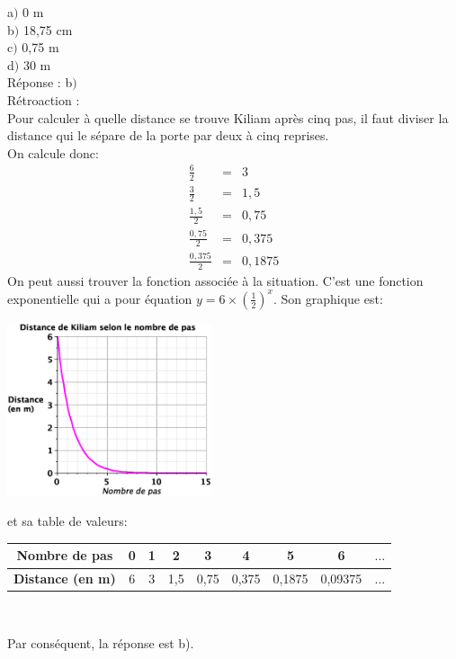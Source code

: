 \documentclass[letterpaper, 12pt]{article}
\begin{document}
a$)$ 0 m\\
b$)$ 18,75 cm\\
c$)$ 0,75 m\\
d$)$ 30 m\\

R\'eponse : b$)$\\

R\'etroaction :\\
Pour calculer \`a quelle distance se trouve Kiliam apr\`es cinq pas, il faut diviser la distance qui le s\'epare de la porte par deux \`a cinq reprises. \\
On calcule donc:
\begin{eqnarray*}
 \frac{6}{2}&=&3\\[2mm]
\frac{3}{2}&=&1,5\\[2mm]
\frac{1,5}{2}&=&0,75\\[2mm]
\frac{0,75}{2}&=&0,375\\[2mm]
\frac{0,375}{2}&=&0,1875
\end{eqnarray*}
On peut aussi trouver la fonction associ\'ee \`a la situation. C'est une fonction exponentielle qui a pour \'equation $y=6\times \left(\frac{1}{2}\right)^{x}$. Son graphique est:\\
\begin{center}
 \includegraphics[width=6cm,bb=20 170 575 621]{Q2085a.eps}
\end{center}
et sa table de valeurs:
\begin{center}
 \begin{tabular}{|c||c| c | c | c | c | c | c | c |} \hline
{\bf Nombre de pas} & 0 & 1 & 2 & 3 & 4 & 5 & 6 & $\ldots$ \\ \hline
{\bf Distance (en m)} & 6 & 3 & 1,5 & 0,75 & 0,375 & 0,1875 & 0,09375 & $\ldots$ \\ \hline
\end{tabular}\\[2mm]
\end{center}
Par cons\'equent, la r\'eponse est b).\\
\end{document}
